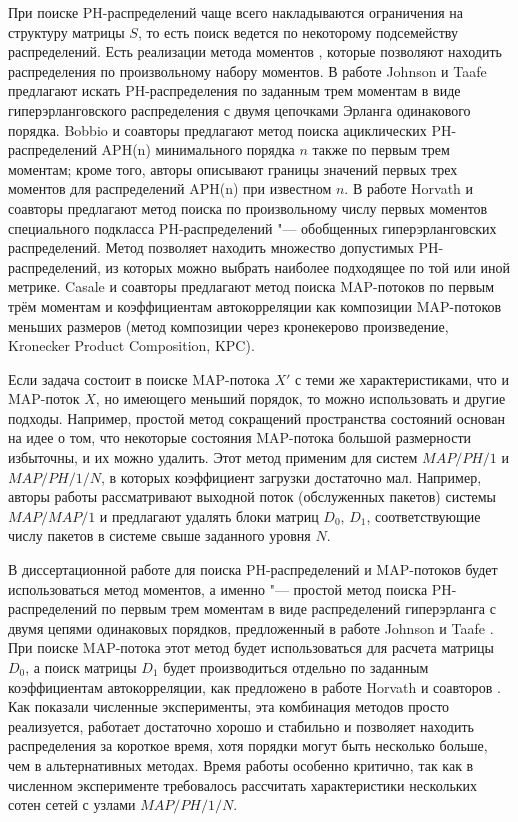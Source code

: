 При поиске PH-распределений чаще всего накладываются ограничения на структуру матрицы $S$, то есть поиск ведется по некоторому подсемейству распределений. Есть реализации метода моментов \cite{Johnson1989, Bobbio2005, Horvath2007, Horvath2013}, которые позволяют находить распределения по произвольному набору моментов. В работе Johnson и Taafe \cite{Johnson1989} предлагают искать PH-распределения по заданным трем моментам в виде гиперэрланговского распределения с двумя цепочками Эрланга одинакового порядка. Bobbio и соавторы \cite{Bobbio2005} предлагают метод поиска ациклических PH-распределений APH(n) минимального порядка $n$ также по первым трем моментам; кроме того, авторы описывают границы значений первых трех моментов для распределений APH(n) при известном $n$. В работе \cite{Horvath2013} Horvath и соавторы предлагают метод поиска по произвольному числу первых моментов специального подкласса PH-распределений "--- обобщенных гиперэрланговских распределений. Метод позволяет находить множество допустимых PH-распределений, из которых можно выбрать наиболее подходящее по той или иной метрике. Casale и соавторы \cite{Casale2010} предлагают метод поиска MAP-потоков по первым трём моментам и коэффициентам автокорреляции как композиции MAP-потоков меньших размеров (метод композиции через кронекерово произведение, Kronecker Product Composition, KPC).

Если задача состоит в поиске MAP-потока $X'$ с теми же характеристиками, что и MAP-поток $X$, но имеющего меньший порядок, то можно использовать и другие подходы. Например, простой метод сокращений пространства состояний основан на идее о том, что некоторые состояния MAP-потока большой размерности избыточны, и их можно удалить. Этот метод применим для систем $MAP/PH/1$ и $MAP/PH/1/N$, в которых коэффициент загрузки достаточно мал. Например, авторы работы \cite{Horvath2010} рассматривают выходной поток (обслуженных пакетов) системы $MAP/MAP/1$ и предлагают удалять блоки матриц $D_0,\,D_1$, соответствующие числу пакетов в системе свыше заданного уровня $N$.

В диссертационной работе для поиска PH-распределений и MAP-потоков будет использоваться метод моментов, а именно "--- простой метод поиска PH-распределений по первым трем моментам в виде распределений гиперэрланга с двумя цепями одинаковых порядков, предложенный в работе Johnson и Taafe \cite{Johnson1989}. При поиске MAP-потока этот метод будет использоваться для расчета матрицы $D_0$, а поиск матрицы $D_1$ будет производиться отдельно по заданным коэффициентам автокорреляции, как предложено в работе Horvath и соавторов \cite{Horvath2005}. Как показали численные эксперименты, эта комбинация методов просто реализуется, работает достаточно хорошо и стабильно и позволяет находить распределения за короткое время, хотя порядки могут быть несколько больше, чем в альтернативных методах. Время работы особенно критично, так как в численном эксперименте требовалось рассчитать характеристики нескольких сотен сетей с узлами $MAP/PH/1/N$.



